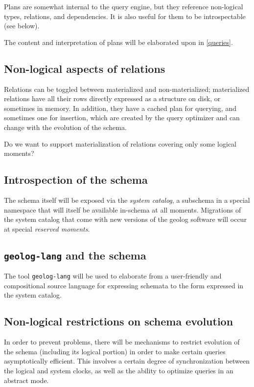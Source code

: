 \documentclass{article}
\begin{document}
Plans are somewhat internal to the query engine, but they reference non-logical types, relations, and dependencies.  It is also useful for them to be introspectable (see below).

The content and interpretation of plans will be elaborated upon in \cref{queries}.

\subsection{Non-logical aspects of relations}

Relations can be toggled between materialized and non-materialized; materialized relations have all their rows directly expressed as a structure on disk, or sometimes in memory.  In addition, they have a cached plan for querying, and sometimes one for insertion, which are created by the query optimizer and can change with the evolution of the schema.

\begin{question}
	Do we want to support materialization of relations covering only some logical moments?
\end{question}

\subsection{Introspection of the schema}

The schema itself will be exposed via the \emph{system catalog}, a subschema in a special namespace that will itself be available in-schema at all moments.  Migrations of the system catalog that come with new versions of the geolog software will occur at special \emph{reserved moments}.

\subsection{{\tt geolog-lang} and the schema}

The tool {\tt geolog-lang} will be used to elaborate from a user-friendly and compositional source language for expressing schemata to the form expressed in the system catalog.

\subsection{Non-logical restrictions on schema evolution}

In order to prevent problems, there will be mechanisms to restrict evolution of the schema (including its logical portion) in order to make certain queries asymptotically efficient.  This involves a certain degree of synchronization between the logical and system clocks, as well as the ability to optimize queries in an abstract mode.
\end{document}
